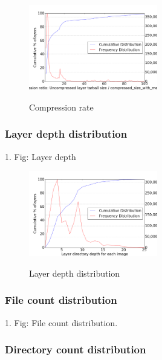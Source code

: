 \begin{figure}
	\centering
	\includegraphics[width=0.5\textwidth]{graphs/Compression_ratio_Uncompressed_layer_tarball_size_divided_by_compressed_size_with_method_gzip.png}\\
	\caption{Compression rate}\label{fig_image_size_compression}
\end{figure}

\subsubsection{Layer depth distribution}

1. Fig: Layer depth

\begin{figure}
	\centering
	\includegraphics[width=0.5\textwidth]{graphs/Layer_directory_depth_for_each_image.png}\\
	\caption{Layer depth distribution}\label{fig_image_size_compression}
\end{figure}


\subsubsection{File count distribution}

1. Fig: File count distribution.

\subsubsection{Directory count distribution}

